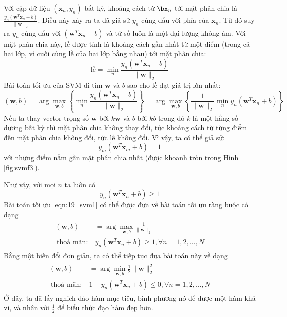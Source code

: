 Với cặp dữ liệu 
$(\mathbf{x}_n, y_n)$ bất kỳ, khoảng cách từ $\bx_n$ tới mặt phân chia là
\begin{math} 
\frac{y_n(\mathbf{w}^T\mathbf{x}_n + b)}{\|\mathbf{w}\|_2} 
\end{math}. 
Điều này xảy ra ta đã giả sử $y_n$ cùng dấu với {phía} của $\mathbf{x}_n$. Từ đó suy ra $y_n$ cùng dấu với
$(\mathbf{w}^T\mathbf{x}_n + b)$ và tử số luôn là một đại lượng không âm.
Với mặt phân chia này, lề được tính là khoảng cách gần nhất từ một
điểm (trong cả hai lớp, vì cuối cùng lề của hai lớp bằng nhau)
tới mặt phân chia:
\begin{equation*} 
\text{lề} = \min_{n} \frac{y_n(\mathbf{w}^T\mathbf{x}_n + b)}{\|\mathbf{w}\|_2} 
\end{equation*} 
Bài toán tối ưu của SVM đi tìm $\mathbf{w}$ và $b$ sao cho lề đạt giá trị lớn nhất: 
\begin{equation} 
\label{eqn:19_svm1}
(\mathbf{w}, b) = \arg\max_{\mathbf{w}, b} \left\{ 
    \min_{n} \frac{y_n(\mathbf{w}^T\mathbf{x}_n + b)}{\|\mathbf{w}\|_2}  
\right\} 
= \arg\max_{\mathbf{w}, b}\left\{ 
    \frac{1}{\|\mathbf{w}\|_2} \min_{n} y_n(\mathbf{w}^T\mathbf{x}_n + b) 
\right\}
\end{equation} 
Nếu ta thay vector trọng số $\mathbf{w}$ bởi
$k\mathbf{w}$ và $b$ bởi $kb$ trong đó $k$ là một hằng số dương {bất kỳ}
thì mặt phân chia không thay đổi, tức khoảng cách từ từng điểm đến mặt phân chia
không đổi, tức lề không đổi. Vì vậy, ta có thể giả
sử:
\begin{equation*} 
y_m(\mathbf{w}^T\mathbf{x}_m + b) = 1 %
\end{equation*} 
{với những điểm nằm gần mặt phân chia nhất} (được khoanh tròn trong Hình \ref{fig:svmf3}).

Như vậy, với mọi $n$ ta luôn có 
\begin{equation*} 
y_n(\mathbf{w}^T\mathbf{x}_n + b) \geq 1 
\end{equation*} 
Bài toán tối ưu \eqref{eqn:19_svm1} có thể được đưa về bài toán tối ưu ràng buộc có dạng 
\begin{eqnarray} 
\begin{aligned}
    (\mathbf{w}, b) &= \arg \max_{\mathbf{w}, b} \frac{1}{\|\mathbf{w}\|_2}   \\\ 
    \text{thoả mãn:}~ & y_n(\mathbf{w}^T\mathbf{x}_n + b) \geq 1, \forall n = 1, 2, \dots, N 
\end{aligned}
\end{eqnarray} 
Bằng một biến đổi đơn giản, ta có thể tiếp tục đưa bài toán này về dạng 
\begin{eqnarray} 
    \label{eqn:19_svm3}
\begin{aligned}
    (\mathbf{w}, b) &= \arg \min_{\mathbf{w}, b} \frac{1}{2}\|\mathbf{w}\|_2^2   \\\ 
    \text{thoả mãn:}~ & 1 - y_n(\mathbf{w}^T\mathbf{x}_n + b) \leq 0, \forall n = 1, 2, \dots, N
\end{aligned}
\end{eqnarray} 
Ở đây, ta đã lấy nghịch đảo hàm mục tiêu, bình phương nó để được một hàm
khả vi, và nhân với $\displaystyle\frac{1}{2}$ để biểu thức đạo hàm đẹp hơn. 
 
